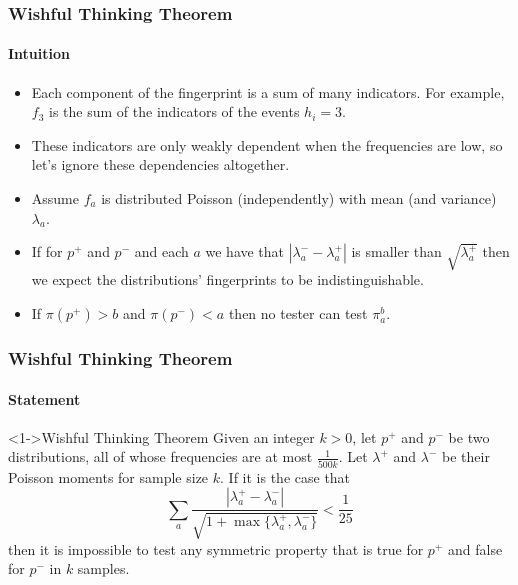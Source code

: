 \documentclass{beamer}
\begin{document}
\begin{frame}
  \frametitle{Wishful Thinking Theorem} \framesubtitle{Intuition}

  \begin{block}{}
    \begin{itemize}
    \item<1-> Each component of the fingerprint is a sum of many
      indicators. For example, $f_3$ is the sum of the indicators of
      the events $h_i=3$.
    \item<2-> These indicators are only weakly dependent when the
      frequencies are low, so let's ignore these dependencies
      altogether.
    \item<3-> Assume $f_a$ is distributed Poisson (independently) with mean
      (and variance) $\lambda_a$.
    \item<4-> If for $p^+$ and $p^-$ and each $a$ we have that
      $|\lambda^-_a-\lambda^+_a|$ is smaller than $\sqrt{\lambda^+_a}$
      then we expect the distributions' fingerprints to be
      indistinguishable.
    \item<5-> If $\pi(p^+)>b$ and $\pi(p^-)<a$ then no tester can test
      $\pi_a^b$.
    \end{itemize}
  \end{block}
\end{frame}


\begin{frame}
  \frametitle{Wishful Thinking Theorem} \framesubtitle{Statement}

  \begin{block}<1->{Wishful Thinking Theorem}
    Given an integer $k>0$, let $p^+$ and $p^-$ be two distributions,
    all of whose frequencies are at most $\frac{1}{500k}$. Let
    $\lambda^+$ and $\lambda^-$ be their Poisson moments for sample
    size $k$. If it is the case that
    \begin{equation*}
      \sum_a\frac{|\lambda^+_a-\lambda^-_a|}{\sqrt{1+\max\{\lambda^+_a,\lambda^-_a\}}}<\frac{1}{25}
    \end{equation*}
    then it is impossible to test any symmetric property that is true
    for $p^+$ and false for $p^-$ in $k$ samples.
  \end{block}
\end{frame}
\end{document}
